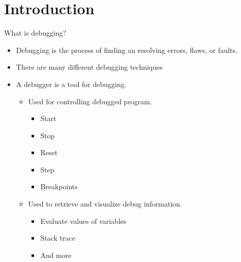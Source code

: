 \section{Introduction}

\begin{frame}{What is debugging?}
	\begin{itemize}
		\item Debugging is the process of finding an resolving errors, flaws, or faults.
		\item There are many different debugging techniques
		\item A debugger is a tool for debugging.
			\begin{itemize}
				\item Used for controlling debugged program.
			    \begin{itemize}
            \item Start
            \item Stop
            \item Reset
            \item Step
            \item Breakpoints
          \end{itemize}
				\item Used to retrieve and visualize debug information.
			    \begin{itemize}
            \item Evaluate values of variables
            \item Stack trace
            \item And more
          \end{itemize}
      \end{itemize}
	\end{itemize}
\end{frame}


